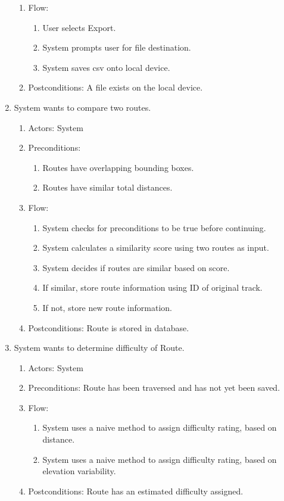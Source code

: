 \documentclass{article}
\begin{document}
\begin{enumerate}
\begin{enumerate}
        \item Flow:
            \begin{enumerate}
            \item User selects Export.
            \item System prompts user for file destination.
            \item System saves csv onto local device.
            \end{enumerate}
        \item Postconditions: A file exists on the local device.
    \end{enumerate}
\item System wants to compare two routes.
    \begin{enumerate}
        \item Actors: System
        \item Preconditions:
            \begin{enumerate}
            \item Routes have overlapping bounding boxes.
            \item Routes have similar total distances.
            \end{enumerate}
        \item Flow:
            \begin{enumerate}
            \item System checks for preconditions to be true before continuing.
            \item System calculates a similarity score using two routes as input.
            \item System decides if routes are similar based on score.
            \item If similar, store route information using ID of original track.
            \item If not, store new route information.
            \end{enumerate}
        \item Postconditions: Route is stored in database.
    \end{enumerate}
\item System wants to determine difficulty of Route.
    \begin{enumerate}
        \item Actors: System
        \item Preconditions: Route has been traversed and has not yet been saved.
        \item Flow:
            \begin{enumerate}
            \item System uses a naive method to assign difficulty rating, based on distance.
            \item System uses a naive method to assign difficulty rating, based on elevation variability.
            \end{enumerate}
        \item Postconditions: Route has an estimated difficulty assigned.
    \end{enumerate}
\end{enumerate}
\end{document}
